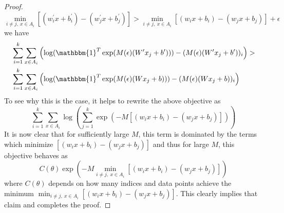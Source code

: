 \begin{proof}
 $$\min_{i\neq j,~x\in A_i} [(w^\prime_ix + b^\prime_i) - (w^\prime_jx + b^\prime_j)] 
 > \min_{i\neq j,~x\in A_i} [(w_ix + b_i) - (w_jx + b_j)] + \epsilon
 $$
 we have
 \begin{equation}
 \begin{split}
  &\displaystyle\sum_{i=1}^k \displaystyle\sum_{x\in A_i} 
 \left(\log(\mathbbm{1}^T\exp(M(\epsilon)(W^\prime x_j + b^\prime))) - (M(\epsilon)(W^\prime x_j + b^\prime))_i\right) > \\
 &\displaystyle\sum_{i=1}^k \displaystyle\sum_{x\in A_i} 
 \left(\log(\mathbbm{1}^T\exp(M(\epsilon)(W x_j + b))) - (M(\epsilon)(W x_j + b))_i\right)
 \end{split}
 \end{equation}
 To see why this is the case, it helps to rewrite the above objective as
 \begin{equation}
  \displaystyle\sum_{i=1}^k \displaystyle\sum_{x\in A_i} \log\left(\displaystyle\sum_{j = 1}^k \exp(-M[(w_ix+b_i) - (w_jx+b_j)])\right)
 \end{equation}
 It is now clear that for sufficiently large $M$, this term is dominated by the terms which minimize $[(w_ix + b_i) - (w_jx + b_j)]$
 and thus for large $M$, this objective behaves as
 \begin{equation}
  C(\theta) \exp(-M\min_{i\neq j,~x\in A_i} [(w_ix + b_i) - (w_jx + b_j)])
 \end{equation}
 where $C(\theta)$ depends on how many indices and data points 
 achieve the minimum $\min_{i\neq j,~x\in A_i} [(w_ix + b_i) - (w_jx + b_j)]$. This clearly implies that claim and completes the
 proof.


\end{proof}

